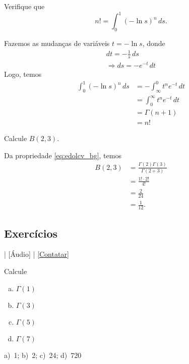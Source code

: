 \begin{exeresol}
  Verifique que
  \begin{equation}
    n! = \int_0^1 (-\ln s)^n\,ds.
  \end{equation}
\end{exeresol}
\begin{resol}
  Fazemos as mudanças de variáveis $t = -\ln s$, donde
  \begin{gather}
    dt = -\frac{1}{s}\,ds \\
    \Rightarrow ds = -e^{-t}\,dt
  \end{gather}
  Logo, temos
  \begin{align}
    \int_0^1 (-\ln s)^n\,ds &= -\int_\infty^0 t^ne^{-t}\,dt\\
    &= \int_0^\infty t^ne^{-t}\,dt\\
    &= \Gamma(n+1) \\
    &= n!
  \end{align}
\end{resol}

\begin{exeresol}
  Calcule $B(2,3)$.
\end{exeresol}
\begin{resol}
  Da propriedade \eqref{eq:edolcv_bg}, temos
  \begin{align}
    B(2,3) &= \frac{\Gamma(2)\Gamma(3)}{\Gamma(2+3)}\\
    &= \frac{1!\cdot 2!}{4!} \\
    &= \frac{2}{24} \\
    &= \frac{1}{12}.
  \end{align}
\end{resol}

\subsection*{Exercícios}

\begin{flushright}
  [Vídeo] | [Áudio] | \href{https://phkonzen.github.io/notas/contato.html}{[Contatar]}
\end{flushright}

\begin{exer}
  Calcule
  \begin{enumerate}[a)]
  \item $\Gamma(1)$\\
  \item $\Gamma(3)$\\
  \item $\Gamma(5)$\\
  \item $\Gamma(7)$
  \end{enumerate}
\end{exer}
\begin{resp}
  a)~1; b)~2; c)~24; d)~720
\end{resp}

